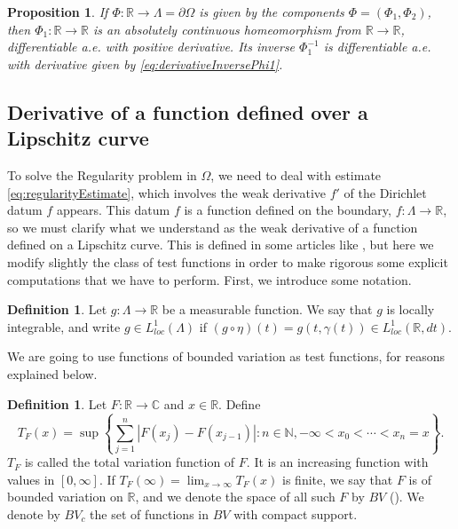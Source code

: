 \documentclass[12pt]{amsart}
\newcommand{\R}{\mathbb{R}}
\newcommand{\C}{\mathbb{C}}
\theoremstyle{plain}
\newtheorem{proposition}[theorem]{Proposition}
\theoremstyle{definition}
\newtheorem{definition}[theorem]{Definition}
\numberwithin{equation}{section}
\begin{document}
\begin{proposition}\label{prop:observacionPhi1Prima}
    If $\Phi\colon \R\to\Lambda=\partial\Omega$ is given by the components $\Phi=(\Phi_1,\Phi_2)$, then $\Phi_1\colon \R\to\R$ is an absolutely continuous homeomorphism from $\R\to\R$, differentiable a.e. with positive derivative. Its inverse $\Phi_{1}^{-1}$ is differentiable a.e. with derivative given by \eqref{eq:derivativeInversePhi1}.
\end{proposition}



\subsection{Derivative of a function defined over a Lipschitz curve}

To solve the Regularity problem in $\Omega$, we need to deal with estimate \eqref{eq:regularityEstimate}, which involves 
the weak derivative $f'$ of the Dirichlet datum $f$ appears. This datum $f$ is a function defined on the boundary, $f\colon \Lambda\to \R$, so we must clarify what we understand as the weak derivative of a function defined on a Lipschitz curve. This is defined in some articles like \cite{VerchotaLayer}, but here we modify slightly the class of test functions in order to make rigorous some explicit computations that we have to perform. First, we introduce some notation.





\begin{definition}
Let $g\colon \Lambda\to \R$ be a measurable function. We say that $g$ is locally integrable, and write $g\in L_{loc}^{1}(\Lambda)$ if $(g\circ\eta)(t)=g(t,\gamma(t))\in L_{loc}^{1}(\R,dt)$.
\end{definition}



We are going to use functions of bounded variation as test functions, for reasons explained below. 
\begin{definition}
    Let $F\colon \R\to\C$ and $x\in\R$. Define
    \[
    T_F(x)
    =
    \sup \left\{\sum_{j=1}^n\left|F\left(x_j\right)-F\left(x_{j-1}\right)\right|: n \in \mathbb{N},-\infty<x_0<\cdots<x_n=x\right\}.
    \]
    $T_F$ is called the total variation function of $F$.
    It is an increasing function with values in $[0, \infty]$. If $T_F(\infty)=\lim _{x \rightarrow \infty} T_F(x)$ is finite, we say that $F$ is of bounded variation on $\mathbb{R}$, and we denote the space of all such $F$ by $BV$ (\cite{follandRealAnalysis}). We denote by $BV_{c}$ the set of functions in $BV$ with compact support.
\end{definition}
\end{document}
